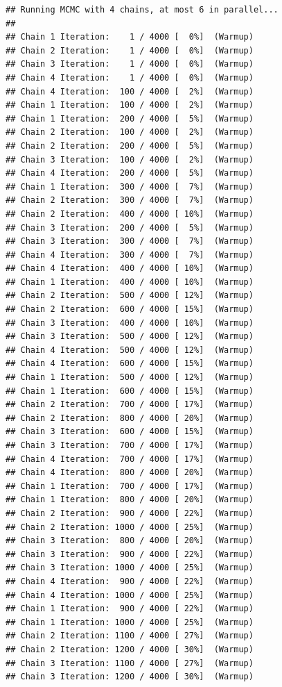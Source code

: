 \documentclass[
]{article}
\begin{document}
\begin{verbatim}
## Running MCMC with 4 chains, at most 6 in parallel...
## 
## Chain 1 Iteration:    1 / 4000 [  0%]  (Warmup) 
## Chain 2 Iteration:    1 / 4000 [  0%]  (Warmup) 
## Chain 3 Iteration:    1 / 4000 [  0%]  (Warmup) 
## Chain 4 Iteration:    1 / 4000 [  0%]  (Warmup) 
## Chain 4 Iteration:  100 / 4000 [  2%]  (Warmup) 
## Chain 1 Iteration:  100 / 4000 [  2%]  (Warmup) 
## Chain 1 Iteration:  200 / 4000 [  5%]  (Warmup) 
## Chain 2 Iteration:  100 / 4000 [  2%]  (Warmup) 
## Chain 2 Iteration:  200 / 4000 [  5%]  (Warmup) 
## Chain 3 Iteration:  100 / 4000 [  2%]  (Warmup) 
## Chain 4 Iteration:  200 / 4000 [  5%]  (Warmup) 
## Chain 1 Iteration:  300 / 4000 [  7%]  (Warmup) 
## Chain 2 Iteration:  300 / 4000 [  7%]  (Warmup) 
## Chain 2 Iteration:  400 / 4000 [ 10%]  (Warmup) 
## Chain 3 Iteration:  200 / 4000 [  5%]  (Warmup) 
## Chain 3 Iteration:  300 / 4000 [  7%]  (Warmup) 
## Chain 4 Iteration:  300 / 4000 [  7%]  (Warmup) 
## Chain 4 Iteration:  400 / 4000 [ 10%]  (Warmup) 
## Chain 1 Iteration:  400 / 4000 [ 10%]  (Warmup) 
## Chain 2 Iteration:  500 / 4000 [ 12%]  (Warmup) 
## Chain 2 Iteration:  600 / 4000 [ 15%]  (Warmup) 
## Chain 3 Iteration:  400 / 4000 [ 10%]  (Warmup) 
## Chain 3 Iteration:  500 / 4000 [ 12%]  (Warmup) 
## Chain 4 Iteration:  500 / 4000 [ 12%]  (Warmup) 
## Chain 4 Iteration:  600 / 4000 [ 15%]  (Warmup) 
## Chain 1 Iteration:  500 / 4000 [ 12%]  (Warmup) 
## Chain 1 Iteration:  600 / 4000 [ 15%]  (Warmup) 
## Chain 2 Iteration:  700 / 4000 [ 17%]  (Warmup) 
## Chain 2 Iteration:  800 / 4000 [ 20%]  (Warmup) 
## Chain 3 Iteration:  600 / 4000 [ 15%]  (Warmup) 
## Chain 3 Iteration:  700 / 4000 [ 17%]  (Warmup) 
## Chain 4 Iteration:  700 / 4000 [ 17%]  (Warmup) 
## Chain 4 Iteration:  800 / 4000 [ 20%]  (Warmup) 
## Chain 1 Iteration:  700 / 4000 [ 17%]  (Warmup) 
## Chain 1 Iteration:  800 / 4000 [ 20%]  (Warmup) 
## Chain 2 Iteration:  900 / 4000 [ 22%]  (Warmup) 
## Chain 2 Iteration: 1000 / 4000 [ 25%]  (Warmup) 
## Chain 3 Iteration:  800 / 4000 [ 20%]  (Warmup) 
## Chain 3 Iteration:  900 / 4000 [ 22%]  (Warmup) 
## Chain 3 Iteration: 1000 / 4000 [ 25%]  (Warmup) 
## Chain 4 Iteration:  900 / 4000 [ 22%]  (Warmup) 
## Chain 4 Iteration: 1000 / 4000 [ 25%]  (Warmup) 
## Chain 1 Iteration:  900 / 4000 [ 22%]  (Warmup) 
## Chain 1 Iteration: 1000 / 4000 [ 25%]  (Warmup) 
## Chain 2 Iteration: 1100 / 4000 [ 27%]  (Warmup) 
## Chain 2 Iteration: 1200 / 4000 [ 30%]  (Warmup) 
## Chain 3 Iteration: 1100 / 4000 [ 27%]  (Warmup) 
## Chain 3 Iteration: 1200 / 4000 [ 30%]  (Warmup) 

\end{verbatim}
\end{document}
